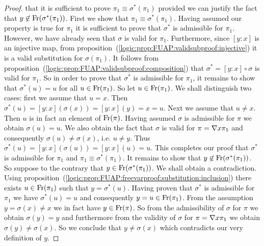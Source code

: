 \begin{proof}
that it is sufficient to prove $\pi_{1}\equiv\sigma^{*}(\pi_{1})$
provided we can justify the fact that
$y\not\in\mbox{\rm Fr}(\sigma^{*}(\pi_{1}))$. First we show that
$\pi_{1}\equiv\sigma^{*}(\pi_{1})$. Having assumed our property is
true for $\pi_{1}$ it is sufficient to prove that $\sigma^{*}$ is
admissible for $\pi_{1}$. However, we have already seen that
$\sigma$ is valid for $\pi_{1}$. Furthermore, since $[y\!:\!x]$ is
an injective map, from
proposition~(\ref{logic:prop:FUAP:validsubproof:injective}) it is a
valid substitution for $\sigma(\pi_{1})$. It follows from
proposition~(\ref{logic:prop:FUAP:validsubproof:composition}) that
$\sigma^{*}=[y\!:\!x]\circ\sigma$ is valid for $\pi_{1}$. So in
order to prove that $\sigma^{*}$ is admissible for $\pi_{1}$, it
remains to show that $\sigma^{*}(u)=u$ for all $u\in\mbox{\rm Fr}(\pi_{1})$.
So let $u\in\mbox{\rm Fr}(\pi_{1})$. We shall distinguish two cases: first
we assume that $u=x$. Then
$\sigma^{*}(u)=[y\!:\!x](\sigma(x))=[y\!:\!x](y)=x=u$. Next we
assume that $u\neq x$. Then $u$ is in fact an element of
$\mbox{\rm Fr}(\pi)$. Having assumed $\sigma$ is admissible for $\pi$ we
obtain $\sigma(u)=u$. We also obtain the fact that $\sigma$ is valid
for $\pi=\mbox{$\nabla$} x\pi_{1}$ and consequently $\sigma(u)\neq\sigma(x)$,
i.e. $u\neq y$. Thus
$\sigma^{*}(u)=[y\!:\!x](\sigma(u))=[y\!:\!x](u)=u$. This completes
our proof that $\sigma^{*}$ is admissible for $\pi_{1}$ and
$\pi_{1}\equiv\sigma^{*}(\pi_{1})$. It remains to show that
$y\not\in\mbox{\rm Fr}(\sigma^{*}(\pi_{1}))$. So suppose to the contrary
that $y\in\mbox{\rm Fr}(\sigma^{*}(\pi_{1}))$. We shall obtain a
contradiction. Using
proposition~(\ref{logic:prop:FUAP:freevarproof:substitution:inclusion})
there exists $u\in\mbox{\rm Fr}(\pi_{1})$ such that $y=\sigma^{*}(u)$.
Having proven that $\sigma^{*}$ is admissible for $\pi_{1}$ we have
$\sigma^{*}(u)=u$ and consequently $y=u\in\mbox{\rm Fr}(\pi_{1})$. From the
assumption $y=\sigma(x)\neq x$ we in fact have $y\in\mbox{\rm Fr}(\pi)$. So
from the admissibility of $\sigma$ for $\pi$ we obtain $\sigma(y)=y$
and furthermore from the validity of $\sigma$ for $\pi=\mbox{$\nabla$}
x\pi_{1}$ we obtain $\sigma(y)\neq\sigma(x)$. So we conclude that
$y\neq\sigma(x)$ which contradicts our very definition of $y$.
\end{proof}
